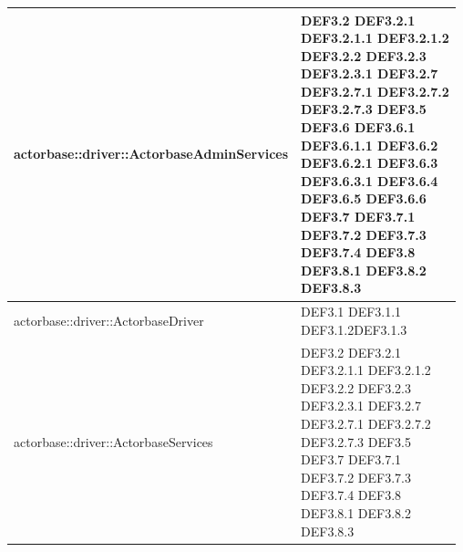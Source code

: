 \documentclass{scalatekids-article}
\begin{document}
\begin{longtable}[H]{|p{12cm}|p{5.5cm}|}
actorbase::driver::ActorbaseAdminServices & \multiLineCell[t]{DEF3.2 DEF3.2.1\\DEF3.2.1.1 DEF3.2.1.2\\DEF3.2.2 DEF3.2.3\\DEF3.2.3.1 DEF3.2.7\\DEF3.2.7.1 DEF3.2.7.2\\DEF3.2.7.3 DEF3.5\\DEF3.6 DEF3.6.1\\DEF3.6.1.1 DEF3.6.2\\DEF3.6.2.1 DEF3.6.3\\DEF3.6.3.1 DEF3.6.4\\DEF3.6.5 DEF3.6.6\\DEF3.7 DEF3.7.1\\DEF3.7.2 DEF3.7.3\\DEF3.7.4 DEF3.8\\DEF3.8.1 DEF3.8.2\\DEF3.8.3}\\
\hline
actorbase::driver::ActorbaseDriver & \multiLineCell[t]{DEF3.1 DEF3.1.1\\DEF3.1.2DEF3.1.3\\}\\
\hline
actorbase::driver::ActorbaseServices & \multiLineCell[t]{DEF3.2 DEF3.2.1\\DEF3.2.1.1 DEF3.2.1.2\\DEF3.2.2 DEF3.2.3\\DEF3.2.3.1 DEF3.2.7\\DEF3.2.7.1 DEF3.2.7.2\\DEF3.2.7.3 DEF3.5\\DEF3.7 DEF3.7.1\\DEF3.7.2 DEF3.7.3\\DEF3.7.4 DEF3.8\\DEF3.8.1 DEF3.8.2\\DEF3.8.3}\\
\hline

\end{longtable}
\end{document}
